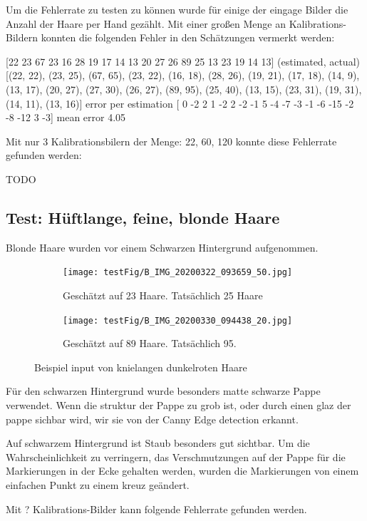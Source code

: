 \documentclass[german,a4paper,12pt]{llncs}
\begin{document}
Um die Fehlerrate zu testen zu können wurde für einige der eingage Bilder die Anzahl der Haare per Hand gezählt.
Mit einer großen Menge an Kalibrations-Bildern konnten die folgenden Fehler in den Schätzungen vermerkt werden:
 
[22 23 67 23 16 28 19 17 14 13 20 27 26 89 25 13 23 19 14 13]
(estimated, actual)
[(22, 22), (23, 25), (67, 65), (23, 22), (16, 18), (28, 26), (19, 21), (17, 18), (14, 9), (13, 17), (20, 27), (27, 30), (26, 27), (89, 95), (25, 40), (13, 15), (23, 31), (19, 31), (14, 11), (13, 16)]
error per estimation [  0  -2   2   1  -2   2  -2  -1   5  -4  -7  -3  -1  -6 -15  -2  -8 -12 3  -3]
mean error 4.05

Mit nur 3 Kalibrationsbilern der Menge: 22, 60, 120 konnte diese Fehlerrate gefunden werden:

TODO

\subsection{Test: Hüftlange, feine, blonde Haare}

Blonde Haare wurden vor einem Schwarzen Hintergrund aufgenommen. 

\begin{figure}
	\centering
	\begin{subfigure}[b]{0.475\textwidth}
		\centering
		\texttt{[image: testFig/B\_IMG\_20200322\_093659\_50.jpg]}
		\caption[]{Geschätzt auf 23 Haare. Tatsächlich 25 Haare}
		\label{img:tstM1} 
	\end{subfigure}
	\hfill
	\begin{subfigure}[b]{0.475\textwidth} 
		\centering
		\texttt{[image: testFig/B\_IMG\_20200330\_094438\_20.jpg]}
		\caption[]{Geschätzt auf 89 Haare. Tatsächlich 95.}
		\label{img:tstM2}
	\end{subfigure}
	\caption[  ]
	{\small Beispiel input von knielangen dunkelroten Haare} 
	\label{img:tstM}
\end{figure}
Für den schwarzen Hintergrund wurde besonders matte schwarze Pappe verwendet. Wenn die struktur der Pappe zu grob ist, oder durch einen glaz der pappe sichbar wird, wir sie von der Canny Edge detection erkannt. 

Auf schwarzem Hintergrund ist Staub besonders gut sichtbar. Um die Wahrscheinlichkeit zu verringern, das Verschmutzungen auf der Pappe für die Markierungen in der Ecke gehalten werden, wurden die Markierungen von einem einfachen Punkt zu einem kreuz geändert.  

Mit ? Kalibrations-Bilder kann folgende Fehlerrate gefunden werden.
\end{document}
